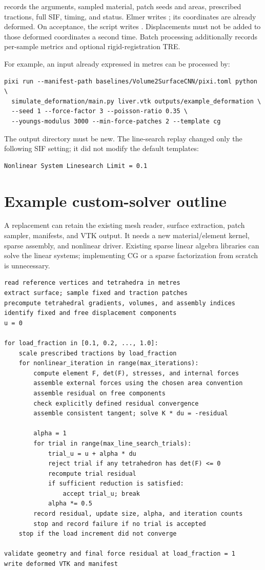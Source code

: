 \documentclass[11pt]{article}
\begin{document}
 records the arguments, sampled material, patch seeds and
areas, prescribed tractions, full SIF, timing, and status. Elmer writes
; its coordinates are already deformed. On acceptance,
the script writes . Displacements must not be added to those
deformed coordinates a second time. Batch processing additionally records
per-sample metrics and optional rigid-registration TRE.

For example, an input already expressed in metres can be processed by:
\begin{lstlisting}
pixi run --manifest-path baselines/Volume2SurfaceCNN/pixi.toml python \
  simulate_deformation/main.py liver.vtk outputs/example_deformation \
  --seed 1 --force-factor 3 --poisson-ratio 0.35 \
  --youngs-modulus 3000 --min-force-patches 2 --template cg
\end{lstlisting}
The output directory must be new. The line-search replay changed only the
following SIF setting; it did not modify the default templates:
\begin{lstlisting}
Nonlinear System Linesearch Limit = 0.1
\end{lstlisting}

\section{Example custom-solver outline}
A replacement can retain the existing mesh reader, surface extraction, patch
sampler, manifests, and VTK output. It needs a new material/element kernel,
sparse assembly, and nonlinear driver. Existing sparse linear algebra libraries
can solve the linear systems; implementing CG or a sparse factorization from
scratch is unnecessary.

\begin{lstlisting}
read reference vertices and tetrahedra in metres
extract surface; sample fixed and traction patches
precompute tetrahedral gradients, volumes, and assembly indices
identify fixed and free displacement components
u = 0

for load_fraction in [0.1, 0.2, ..., 1.0]:
    scale prescribed tractions by load_fraction
    for nonlinear_iteration in range(max_iterations):
        compute element F, det(F), stresses, and internal forces
        assemble external forces using the chosen area convention
        assemble residual on free components
        check explicitly defined residual convergence
        assemble consistent tangent; solve K * du = -residual

        alpha = 1
        for trial in range(max_line_search_trials):
            trial_u = u + alpha * du
            reject trial if any tetrahedron has det(F) <= 0
            recompute trial residual
            if sufficient reduction is satisfied:
                accept trial_u; break
            alpha *= 0.5
        record residual, update size, alpha, and iteration counts
        stop and record failure if no trial is accepted
    stop if the load increment did not converge

validate geometry and final force residual at load_fraction = 1
write deformed VTK and manifest
\end{lstlisting}
\end{document}
